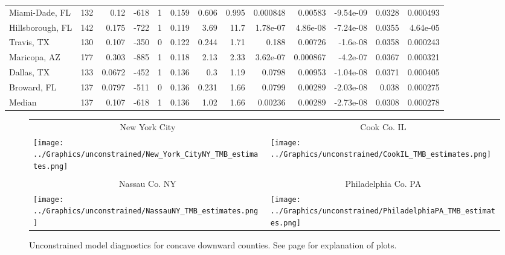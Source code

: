 \documentclass[12pt,letterpaper]{article}
\begin{document}
\begin{sidewaystable}
{\begin{tabular}{lrrrrrrrrrrrr}
 Miami-Dade, FL    &   132 &  0.12   &  -618 &     1 &           0.159 &            0.606 &          0.995 &     0.000848 &     0.00583  &        -9.54e-09 &           0.0328  &        0.000493 \\
 Hillsborough, FL  &   142 &  0.175  &  -722 &     1 &           0.119 &            3.69  &         11.7   &     1.78e-07 &     4.86e-08 &        -7.24e-08 &           0.0355  &        4.64e-05 \\
 Travis, TX        &   130 &  0.107  &  -350 &     0 &           0.122 &            0.244 &          1.71  &     0.188    &     0.00726  &        -1.6e-08  &           0.0358  &        0.000243 \\
 Maricopa, AZ      &   177 &  0.303  &  -885 &     1 &           0.118 &            2.13  &          2.33  &     3.62e-07 &     0.000867 &        -4.2e-07  &           0.0367  &        0.000321 \\
 Dallas, TX        &   133 &  0.0672 &  -452 &     1 &           0.136 &            0.3   &          1.19  &     0.0798   &     0.00953  &        -1.04e-08 &           0.0371  &        0.000405 \\
 Broward, FL       &   137 &  0.0797 &  -511 &     0 &           0.136 &            0.231 &          1.66  &     0.0799   &     0.00289  &        -2.03e-08 &           0.038   &        0.000275 \\
\hline
 Median            &   137 &  0.107  &  -618 &     1 &           0.136 &            1.02  &          1.66  &     0.00236  &     0.00289  &        -2.73e-08 &           0.0308  &        0.000278 \\
\hline
\end{tabular}


}\end{sidewaystable}


\begin{figure}
{\scriptsize
\begin{center}
\begin{tabular}{ll}
\multicolumn{1}{c}{New York City}&\multicolumn{1}{c}{Cook Co. IL}\\
\texttt{[image: ../Graphics/unconstrained/New\_York\_CityNY\_TMB\_estimates.png]}&
\texttt{[image: ../Graphics/unconstrained/CookIL\_TMB\_estimates.png]}\\
\\
\multicolumn{1}{c}{Nassau Co. NY}&\multicolumn{1}{c}{Philadelphia Co.  PA}\\
\texttt{[image: ../Graphics/unconstrained/NassauNY\_TMB\_estimates.png]}&
\texttt{[image: ../Graphics/unconstrained/PhiladelphiaPA\_TMB\_estimates.png]}\\
\end{tabular}
\end{center}
}
\caption{\label{fig:ests1U}
Unconstrained model diagnostics for concave downward counties.
See page \pageref{pp:diagexpl}for explanation of plots.
}
\end{figure}
\end{document}
